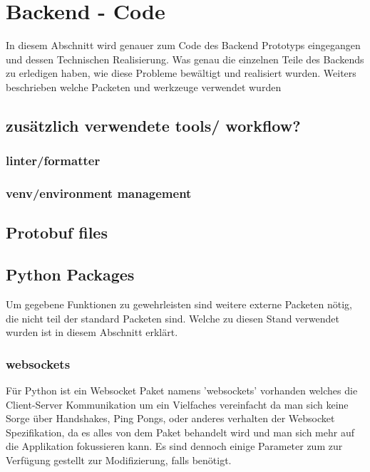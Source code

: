 \section{Backend - Code}
In diesem Abschnitt wird genauer zum Code des Backend Prototyps eingegangen 
und dessen Technischen Realisierung. 
Was genau die einzelnen Teile des Backends zu erledigen haben, 
wie diese Probleme bewältigt und realisiert wurden.
Weiters beschrieben welche Packeten und werkzeuge verwendet wurden 

\subsection{zusätzlich verwendete tools/ workflow?}
\subsubsection{linter/formatter} 
\subsubsection{venv/environment management}



\subsection{Protobuf files}

\subsection{Python Packages}
Um gegebene Funktionen zu gewehrleisten sind weitere externe Packeten nötig, 
die nicht teil der standard Packeten sind.
Welche zu diesen Stand verwendet wurden ist in diesem Abschnitt erklärt.

\subsubsection{websockets}
Für Python ist ein Websocket Paket namens 'websockets' vorhanden welches die Client-Server Kommunikation
um ein Vielfaches vereinfacht da man sich keine Sorge über Handshakes, Ping Pongs, oder anderes verhalten
der Websocket Spezifikation, da es alles von dem Paket behandelt wird 
und man sich mehr auf die Applikation fokussieren kann. 
Es sind dennoch einige Parameter zum zur Verfügung gestellt zur Modifizierung, falls benötigt.

